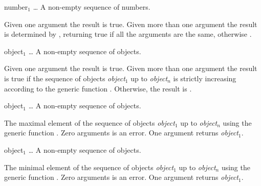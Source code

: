 \begin{optDefinition}
\function{=}
%
\begin{arguments}
    \item[{number$_1$ \ldots}] A non-empty sequence of numbers.
\end{arguments}
%
\result%
Given one argument the result is true.  Given more than one argument the result
is determined by , returning true if all the arguments are
the same, otherwise \nil{}.

\function{<}
%
\begin{arguments}
    \item[object$_1$ \ldots] A non-empty sequence of objects.
\end{arguments}
%
\result%
Given one argument the result is true.  Given more than one argument the result
is true if the sequence of objects {\em object$_1$} up to {\em object$_n$} is
strictly increasing according to the generic function .
Otherwise, the result is \nil{}.

%
\begin{arguments}
    \item[object$_1$ \ldots] A non-empty sequence of objects.
\end{arguments}
%
\result%
The maximal element of the sequence of objects {\em object$_1$} up to {\em
    object$_n$} using the generic function .  Zero arguments
is an error.  One argument returns {\em object$_1$}.

%
\begin{arguments}
    \item[object$_1$ \ldots] A non-empty sequence of objects.
\end{arguments}
%
\result%
The minimal element of the sequence of objects {\em object$_1$} up to {\em
    object$_n$} using the generic function .  Zero arguments
is an error.  One argument returns {\em object$_1$}.
%
\end{optDefinition}
